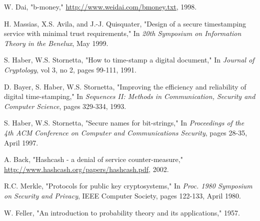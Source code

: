 \documentclass{article}
\begin{document}

\begin{thebibliography}{99}
 
 W. Dai, "b-money," \url{http://www.weidai.com/bmoney.txt}, 1998.
 
 H. Massias, X.S. Avila, and J.-J. Quisquater, "Design of a secure timestamping service with minimal trust requirements," In \textit{20th Symposium on Information Theory in the Benelux}, May 1999.
 
 S. Haber, W.S. Stornetta, "How to time-stamp a digital document," In \textit{Journal of Cryptology}, vol 3, no 2, pages 99-111, 1991.
 
 D. Bayer, S. Haber, W.S. Stornetta, "Improving the efficiency and reliability of digital time-stamping," In \textit{Sequences II: Methods in Communication, Security and Computer Science}, pages 329-334, 1993.
 
 S. Haber, W.S. Stornetta, "Secure names for bit-strings," In \textit{Proceedings of the 4th ACM Conference on Computer and Communications Security}, pages 28-35, April 1997.
 
 A. Back, "Hashcash - a denial of service counter-measure," \url{http://www.hashcash.org/papers/hashcash.pdf}, 2002.
 
 R.C. Merkle, "Protocols for public key cryptosystems," In \textit{Proc. 1980 Symposium on Security and Privacy}, IEEE Computer Society, pages 122-133, April 1980.
 
 W. Feller, "An introduction to probability theory and its applications," 1957.
 
\end{thebibliography}
\end{document}
